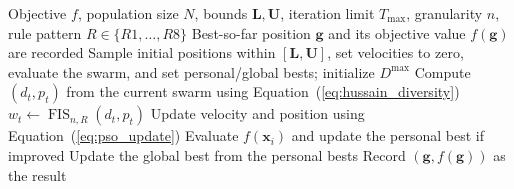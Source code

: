 \begin{algorithm}[H]
\caption{Fuzzy-controlled PSO iteration}
\label{alg:pso_fcs}
\small
\begin{algorithmic}[1]
\Require Objective $f$, population size $N$, bounds $\mathbf{L},\mathbf{U}$, iteration limit $T_{\max}$, granularity $n$, rule pattern $R\in\{R1,\ldots,R8\}$
\Ensure Best-so-far position $\mathbf{g}$ and its objective value $f(\mathbf{g})$ are recorded
\State Sample initial positions within $[\mathbf{L},\mathbf{U}]$, set velocities to zero, evaluate the swarm, and set personal/global bests; initialize $D^{\max}$
	\State Compute $(d_t,p_t)$ from the current swarm using Equation~(\ref{eq:hussain_diversity})
	\State $w_t\gets\operatorname{FIS}_{n,R}(d_t,p_t)$ 
		\State Update velocity and position using Equation~(\ref{eq:pso_update})
		\State Evaluate $f(\mathbf{x}_i)$ and update the personal best if improved
	\EndFor
	\State Update the global best from the personal bests
\EndFor
\State Record $(\mathbf{g},f(\mathbf{g}))$ as the result
\end{algorithmic}
\end{algorithm}
